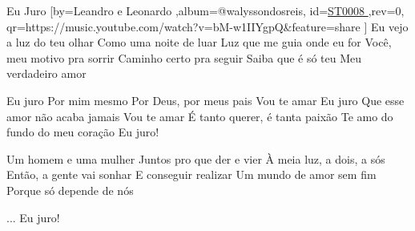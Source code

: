 \beginsong
{Eu Juro %
}[by={Leandro e Leonardo %
},album={@walyssondosreis},
id={\href{https://music.youtube.com/watch?v=bM-w1IIYgpQ&feature=share %
}{ST0008 %
}},rev={0}, %
qr={https://music.youtube.com/watch?v=bM-w1IIYgpQ&feature=share %
}]
\beginverse 
Eu vejo a luz do teu olhar
Como uma noite de luar
Luz que me guia onde eu for
Você, meu motivo pra sorrir
Caminho certo pra seguir
Saiba que é só teu
Meu verdadeiro amor
\endverse

\beginchorus
Eu juro
Por mim mesmo
Por Deus, por meus pais
Vou te amar
Eu juro
Que esse amor não acaba jamais
Vou te amar
É tanto querer, é tanta paixão
Te amo do fundo do meu coração
Eu juro!
\endchorus

\beginverse 
Um homem e uma mulher
Juntos pro que der e vier
À meia luz, a dois, a sós
Então, a gente vai sonhar
E conseguir realizar
Um mundo de amor sem fim
Porque só depende de nós
\endverse

\beginverse 
...
Eu juro!
\endverse

